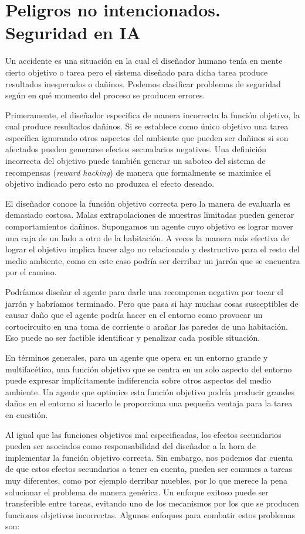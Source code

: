 \documentclass[12pt,a4paper]{article}
\begin{document}
\section{Peligros no intencionados. Seguridad en IA}

Un accidente es una situación en la cual el diseñador humano tenía en mente cierto objetivo o tarea pero el sistema diseñado para dicha tarea produce resultados inesperados o dañinos. Podemos clasificar problemas de seguridad según en qué momento del proceso se producen errores.

Primeramente, el diseñador especifica de manera incorrecta la función objetivo, la cual produce resultados dañinos. Si se establece como único objetivo una tarea específica ignorando otros aspectos del ambiente que pueden ser dañinos si son afectados pueden generarse efectos secundarios negativos. Una definición incorrecta del objetivo puede también generar un saboteo del sistema de recompensas (\emph{reward hacking}) de manera que formalmente se maximice el objetivo indicado pero esto no produzca el efecto deseado.

El diseñador conoce la función objetivo correcta pero la manera de evaluarla es demasiado costosa. Malas extrapolaciones de muestras limitadas pueden generar comportamientos dañinos. Supongamos un agente cuyo objetivo es lograr mover una caja de un lado a otro de la habitación. A veces la manera más efectiva de lograr el objetivo implica hacer algo no relacionado y destructivo para el resto del medio ambiente, como en este caso podría ser derribar un jarrón que se encuentra por el camino.

Podríamos diseñar el agente para darle una recompensa negativa por tocar el jarrón y habríamos terminado. Pero que pasa si hay muchas cosas susceptibles de causar daño que el agente podría hacer en el entorno como provocar un cortocircuito en una toma de corriente o arañar las paredes de una habitación. Eso puede no ser factible identificar y penalizar cada posible situación.

En términos generales, para un agente que opera en un entorno grande y multifacético, una función objetivo que se centra en un solo aspecto del entorno puede expresar implícitamente indiferencia sobre otros aspectos del medio ambiente. Un agente que optimice esta función objetivo podría producir grandes daños en el entorno si hacerlo le proporciona una pequeña ventaja para la tarea en cuestión.

Al igual que las funciones objetivos mal especificadas, los efectos secundarios pueden ser asociados como responsabilidad del diseñador a la hora de implementar la función objetivo correcta. Sin embargo, nos podemos dar cuenta de que estos efectos secundarios a tener en cuenta, pueden ser comunes a tareas muy diferentes, como por ejemplo derribar muebles, por lo que merece la pena solucionar el problema de manera genérica. Un enfoque exitoso puede ser transferible entre tareas, evitando uno de los mecanismos por los que se producen funciones objetivos incorrectas. Algunos enfoques para combatir estos problemas son:
\end{document}
